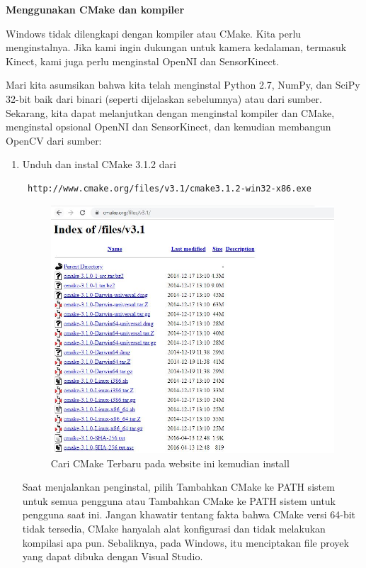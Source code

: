 \newpage
\textbf{Menggunakan CMake dan kompiler}

Windows tidak dilengkapi dengan kompiler atau CMake. Kita perlu menginstalnya. Jika kami ingin dukungan untuk kamera kedalaman, termasuk Kinect, kami juga perlu menginstal OpenNI dan SensorKinect.

Mari kita asumsikan bahwa kita telah menginstal Python 2.7, NumPy, dan SciPy 32-bit baik dari binari (seperti dijelaskan sebelumnya) atau dari sumber. Sekarang, kita dapat melanjutkan dengan menginstal kompiler dan CMake, menginstal opsional OpenNI dan SensorKinect, dan kemudian membangun OpenCV dari sumber:

\begin{enumerate}
	\item Unduh dan instal CMake 3.1.2 dari \begin{verbatim} http://www.cmake.org/files/v3.1/cmake3.1.2-win32-x86.exe \end{verbatim} 
		\begin{figure}[ht]
		\centering
		\includegraphics[scale=0.5]{figures/1,3.jpg}
		\caption{Cari CMake Terbaru pada website ini kemudian install}
		\label{contoh}
		\end{figure}
	Saat menjalankan penginstal, pilih Tambahkan CMake ke PATH sistem untuk semua pengguna atau Tambahkan CMake ke PATH sistem untuk pengguna saat ini. Jangan khawatir tentang fakta bahwa CMake versi 64-bit tidak tersedia, CMake hanyalah alat konfigurasi dan tidak melakukan kompilasi apa pun. Sebaliknya, pada Windows, itu menciptakan file proyek yang dapat dibuka dengan Visual Studio.

\end{enumerate}

